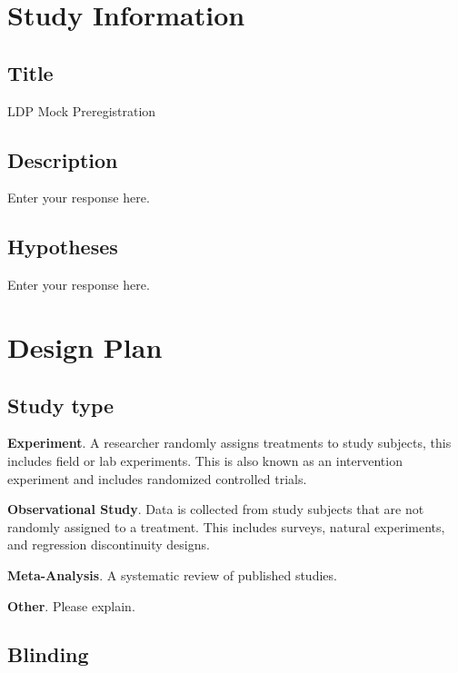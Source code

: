 \documentclass[]{article}
\begin{document}
\hypertarget{study-information}{%
\section{Study Information}\label{study-information}}

\hypertarget{title}{%
\subsection{Title}\label{title}}

LDP Mock Preregistration

\hypertarget{description}{%
\subsection{Description}\label{description}}

Enter your response here.

\hypertarget{hypotheses}{%
\subsection{Hypotheses}\label{hypotheses}}

Enter your response here.

\hypertarget{design-plan}{%
\section{Design Plan}\label{design-plan}}

\hypertarget{study-type}{%
\subsection{Study type}\label{study-type}}

\textbf{Experiment}. A researcher randomly assigns treatments to study
subjects, this includes field or lab experiments. This is also known as
an intervention experiment and includes randomized controlled trials.

\textbf{Observational Study}. Data is collected from study subjects that
are not randomly assigned to a treatment. This includes surveys, natural
experiments, and regression discontinuity designs.

\textbf{Meta-Analysis}. A systematic review of published studies.

\textbf{Other}. Please explain.

\hypertarget{blinding}{%
\subsection{Blinding}\label{blinding}}
\end{document}
